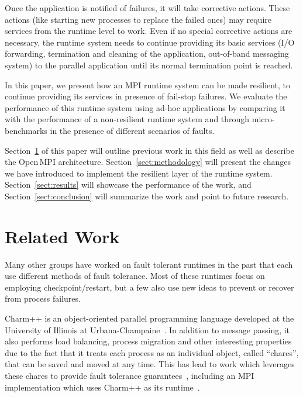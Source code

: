 \documentclass{llncs}
\newcommand{\ompi}{Open\,MPI\xspace}
\begin{document}
Once the application is notified of failures, it will take corrective
actions. These actions (like starting new processes to replace the
failed ones) may require services from the runtime level to work. Even
if no special corrective actions are necessary, the runtime system
needs to continue providing its basic services (I/O forwarding,
termination and cleaning of the application, out-of-band messaging
system) to the parallel application until its normal termination point
is reached.

In this paper, we present how an MPI runtime system can be made
resilient, to continue providing its services in presence of fail-stop
failures. We evaluate the performance of this runtime system
using ad-hoc applications by comparing it with the performance of a
non-resilient runtime system and through micro-benchmarks in the
presence of different scenarios of faults.

Section~\ref{sect:related} of this paper will outline previous work in
this field as well as describe the \ompi architecture.
Section~\ref{sect:methodology} will present the changes we have
introduced to implement the resilient layer of the runtime system.
Section~\ref{sect:results} will showcase the performance of the work,
and Section~\ref{sect:conclusion} will summarize the work and point to
future research.

\section{Related Work}
\label{sect:related}

Many other groups have worked on fault tolerant runtimes in the past
that each use different methods of fault tolerance. Most of these
runtimes focus on employing checkpoint/restart, but a few also use new
ideas to prevent or recover from process failures.


Charm++ is an object-oriented parallel programming language developed
at the University of Illinois at
Urbana-Champaine~\cite{Kale93charm++:a}. In addition to message
passing, it also performs load balancing, process migration and other
interesting properties due to the fact that it treats each process as
an individual object, called ``chares'', that can be saved and moved
at any time. This has lead to work which leverages these chares to
provide fault tolerance guarantees~\cite{10.1109/CLUSTR.2004.1392606},
including an MPI implementation which uses Charm++ as its
runtime~\cite{ampiJournal}.
\end{document}
